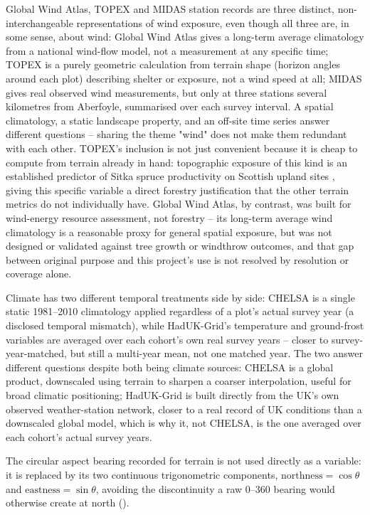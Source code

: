 Global Wind Atlas, TOPEX and MIDAS station records are three distinct, non-interchangeable
representations of wind exposure, even though all three are, in some sense, about wind: Global
Wind Atlas gives a long-term average climatology from a national wind-flow model, not a
measurement at any specific time; TOPEX is a purely geometric calculation from terrain shape
(horizon angles around each plot) describing shelter or exposure, not a wind speed at all; MIDAS
gives real observed wind measurements, but only at three stations several kilometres from
Aberfoyle, summarised over each survey interval. A spatial climatology, a static landscape
property, and an off-site time series answer different questions -- sharing the theme "wind" does
not make them redundant with each other. TOPEX's inclusion is not just convenient because it is
cheap to compute from terrain already in hand: topographic exposure of this kind is an established
predictor of Sitka spruce productivity on Scottish upland sites \citep{worrell1987}, giving this
specific variable a direct forestry justification that the other terrain metrics do not
individually have. Global Wind Atlas, by contrast, was built for wind-energy resource assessment,
not forestry -- its long-term average wind climatology is a reasonable proxy for general spatial
exposure, but was not designed or validated against tree growth or windthrow outcomes, and that
gap between original purpose and this project's use is not resolved by resolution or coverage
alone.

Climate has two different temporal treatments side by side: CHELSA is a single static 1981--2010
climatology applied regardless of a plot's actual survey year (a disclosed temporal mismatch),
while HadUK-Grid's temperature and ground-frost variables are averaged over each cohort's own real
survey years -- closer to survey-year-matched, but still a multi-year mean, not one matched year.
The two answer different questions despite both being climate sources: CHELSA is a global product,
downscaled using terrain to sharpen a coarser interpolation, useful for broad climatic
positioning; HadUK-Grid is built directly from the UK's own observed weather-station network,
closer to a real record of UK conditions than a downscaled global model, which is why it, not
CHELSA, is the one averaged over each cohort's actual survey years.

The circular aspect bearing recorded for terrain is not used directly as a variable: it is
replaced by its two continuous trigonometric components,
$\mathrm{northness}=\cos\theta$ and $\mathrm{eastness}=\sin\theta$, avoiding the discontinuity a
raw 0--360\textdegree{} bearing would otherwise create at north ().


